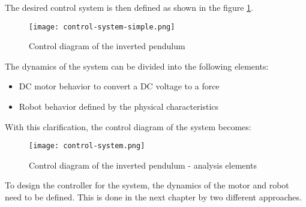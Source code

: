 The desired control system is then defined as shown in the figure \ref{fig:condiag}. \par

\begin{figure}[h]
	\centering
	\texttt{[image: control-system-simple.png]}
	\caption{Control diagram of the inverted pendulum}\label{fig:condiag}
\end{figure}

The dynamics of the system can be divided into the following elements:  \par
\begin{itemize}
	\item DC motor behavior to convert a DC voltage to a force
	\item Robot behavior defined by the physical characteristics
\end{itemize}

With this clarification, the control diagram of the system becomes: \par

\begin{figure}[h]
	\centering
	\texttt{[image: control-system.png]}
	\caption{Control diagram of the inverted pendulum - analysis elements}\label{fig:condiag2}
\end{figure}

To design the controller for the system, the dynamics of the motor and robot need to be defined. This is done in the next chapter by two different approaches.
